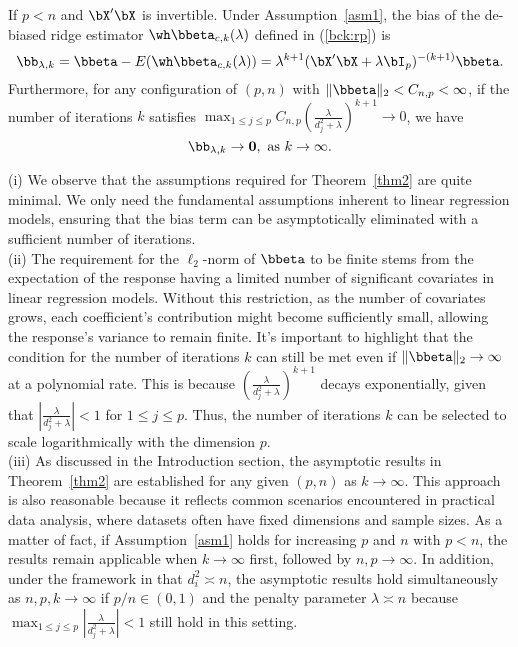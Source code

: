 \begin{theorem}\label{thm2}
     If $p<n$ and $\bX'\bX$ is invertible. Under Assumption~\ref{asm1}, the bias of the de-biased ridge estimator $\wh\bbeta_{c,k}(\lambda)$ defined in (\ref{bck:rp}) is
     \begin{equation}\label{bc:k}
         \bb_{\lambda,k}=\bbeta-E(\wh\bbeta_{c,k}(\lambda))=\lambda^{k+1}(\bX'\bX+\lambda\bI_p)^{-(k+1)}\bbeta.
     \end{equation}
     Furthermore, for any configuration of $(p,n)$ with $\|\bbeta\|_2<C_{n,p}<\infty$, if the number of iterations $k$ satisfies $\max_{1\leq j\leq p}C_{n,p}(\frac{\lambda}{d_j^2+\lambda})^{k+1}\rightarrow 0$, we have
     \[\bb_{\lambda,k}\rightarrow {\bf 0},\,\, \text{as}\,\, k\rightarrow\infty.\]
\end{theorem}
\begin{remark}\label{rm2}
    (i) We observe that the assumptions required for Theorem~\ref{thm2} are quite minimal. We only need the fundamental assumptions inherent to linear regression models, ensuring that the bias term can be asymptotically eliminated with a sufficient number of iterations.\\
    (ii) The requirement for the $\ell_2$-norm of $\bbeta$ to be finite stems from the expectation of the response having a limited number of significant covariates in linear regression models. Without this restriction, as the number of covariates grows, each coefficient's contribution might become sufficiently small, allowing the response's variance to remain finite. It's important to highlight that the condition for the number of iterations $k$ can still be met even if $\|\bbeta\|_2\rightarrow\infty$ at a polynomial rate. This is because $(\frac{\lambda}{d_j^2+\lambda})^{k+1}$  decays exponentially, given that $|\frac{\lambda}{d_j^2+\lambda}|<1$ for $1\leq j\leq p$. Thus, the number of iterations $k$ can be selected to scale logarithmically with the dimension $p$.\\
    (iii) As discussed in the Introduction section, the asymptotic results in Theorem~\ref{thm2} are established for any given 
$(p,n)$ as 
$k\rightarrow\infty$.  This approach is also reasonable because it reflects common scenarios encountered in practical data analysis, where datasets often have fixed dimensions and sample sizes.
As a matter of fact, if Assumption~\ref{asm1} holds for  increasing $p$ and $n$ with $p<n$, the results remain applicable when $k\rightarrow\infty$ first, followed by
$n,p\rightarrow\infty$. In addition, under the framework in \cite{bai1993limit} that $d_i^{2}\asymp n$, the asymptotic results hold simultaneously as $n,p,k\rightarrow\infty$ if $p/n\in(0,1)$ and the penalty parameter $\lambda\asymp n$  because $\max_{1\leq j\leq p}|\frac{\lambda}{d_j^2+\lambda}|<1$ still hold in this setting.\\

\end{remark}
